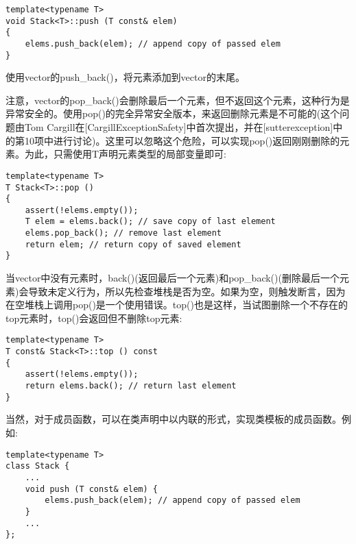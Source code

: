 \begin{lstlisting}[style=styleCXX]
template<typename T>
void Stack<T>::push (T const& elem)
{
	elems.push_back(elem); // append copy of passed elem
}
\end{lstlisting}

使用vector的push\_back()，将元素添加到vector的末尾。

注意，vector的pop\_back()会删除最后一个元素，但不返回这个元素，这种行为是异常安全的。使用pop()的完全异常安全版本，来返回删除元素是不可能的(这个问题由Tom Cargill在[CargillExceptionSafety]中首次提出，并在[sutterexception]中的第10项中进行讨论)。这里可以忽略这个危险，可以实现pop()返回刚刚删除的元素。为此，只需使用T声明元素类型的局部变量即可:

\begin{lstlisting}[style=styleCXX]
template<typename T>
T Stack<T>::pop ()
{
	assert(!elems.empty());
	T elem = elems.back(); // save copy of last element
	elems.pop_back(); // remove last element
	return elem; // return copy of saved element
}
\end{lstlisting}

当vector中没有元素时，back()(返回最后一个元素)和pop\_back()(删除最后一个元素)会导致未定义行为，所以先检查堆栈是否为空。如果为空，则触发断言，因为在空堆栈上调用pop()是一个使用错误。top()也是这样，当试图删除一个不存在的top元素时，top()会返回但不删除top元素:

\begin{lstlisting}[style=styleCXX]
template<typename T>
T const& Stack<T>::top () const
{
	assert(!elems.empty());
	return elems.back(); // return last element
}
\end{lstlisting}

当然，对于成员函数，可以在类声明中以内联的形式，实现类模板的成员函数。例如:

\begin{lstlisting}[style=styleCXX]
template<typename T>
class Stack {
	...
	void push (T const& elem) {
		elems.push_back(elem); // append copy of passed elem
	}
	...
};
\end{lstlisting}






